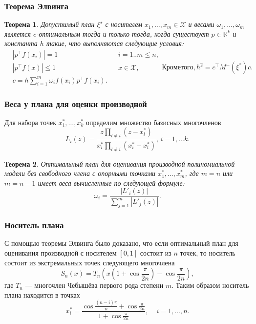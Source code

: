 \documentclass[unicode, notheorems, minimal, nologo]{beamer}
\newtheorem{theorem}{Теорема}
\newcommand\abs[1]{\left\lvert#1\right\rvert}
\begin{document}
\begin{frame}
	\frametitle{Теорема Элвинга \citep{melas2010}}
	\begin{theorem}
	Допустимый план $\xi^\star$ с носителем $x_1, \ldots, x_m \in \mathcal{X}$ и весами $\omega_1, \ldots, \omega_m$ является $c$-оптимальным тогда и только тогда, когда существует $p \in \mathbb{R}^k$ и константа $h$ такие, что выполняются следующие условия:
  \begin{subequations}
  \label{eq:elfving}
  \begin{align}
	&\abs{p^\top f(x_i)} = 1 &&i=1..m \leqslant n, \\
	&\abs{p^\top f(x)} \leqslant 1  &&x \in \mathcal{X}, \\
	&c = h \sum_{i=1}^m \omega_i f(x_i) p^\top f(x_i) .
  \end{align}
  Кроме того,
  \begin{equation*}
  	h^2 = c^\top M^{-}(\xi^{*})c.
  \end{equation*}
  \end{subequations}
	\end{theorem}
\end{frame}

\begin{frame}
	\frametitle{Веса у плана для оценки производной \citep{melasmain}}
	Для набора точек $x_1^*, \ldots, x_k^*$ определим множество базисных многочленов
	\begin{equation*}
		L_i(z) = \frac{z \prod_{l \neq i} (z - x_l^*)}{x_i^* \prod_{l \neq i} (x_i^* - x_l^*)}, \, i = 1, \dots k.
	\end{equation*}
	
	\begin{theorem}
		Оптимальный план для оценивания производной полиномиальной модели без свободного члена с опорными точками $x_1^*, \ldots, x_m^*$, где $m=n$ или $m=n-1$ имеет веса вычисленные по следующей формуле:	
	\begin{equation*}
		\omega_i = \frac{\abs{L'_i(z)}}{\sum_{j=1}^m \abs{L'_j(z)}}.
	\end{equation*}
	\end{theorem}
\end{frame}

\begin{frame}
	\frametitle{Носитель плана}
	С помощью теоремы Элвинга было доказано, что если оптимальный план для оценивания производной с носителем $[0, 1]$ состоит из $n$ точек, то носитель состоит из экстремальных точек следующего многочлена
	\begin{equation*}
		S_n(x) = T_n \left(x \left(1 + \cos \frac{\pi}{2n} \right) - \cos \frac{\pi}{2n} \right),
	\end{equation*}
	где $T_n$ --- многочлен Чебышёва первого рода степени $m$. Таким образом носитель плана находится в точках
	\begin{equation*}
		x_i^* = \frac{\cos \frac{(n - i) \pi}{n} + \cos \frac{\pi}{2n}}{1 + \cos \frac{\pi}{2n}} , \, \quad i = 1, \ldots, n.
	\end{equation*}
\end{frame}
\end{document}
